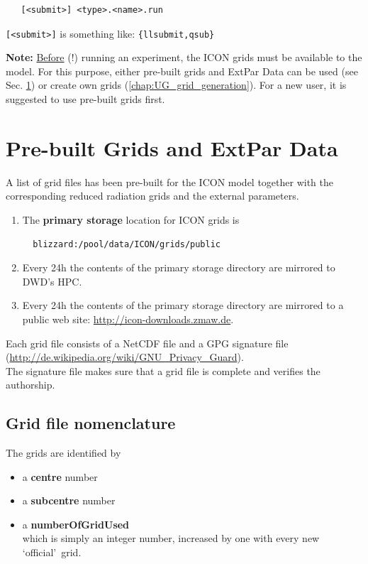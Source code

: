 \begin{small}
  \begin{verbatim}
   [<submit>] <type>.<name>.run
  \end{verbatim}
\end{small} 

\verb+[<submit>]+ is something like: \verb+{llsubmit,qsub}+

\textbf{Note:} \underline{Before} (!) running an experiment, the ICON grids must be available to the model. For this purpose, either pre-built grids and ExtPar Data can be used (see Sec. \ref{chap:prebuilt_grid}) or create own grids (\ref{chap:UG_grid_generation}). For a new user, it is suggested to use pre-built grids first.

\section{Pre-built Grids and ExtPar Data}\label{chap:prebuilt_grid}
A list of grid files has been pre-built for the ICON model together with the corresponding reduced radiation grids and the external parameters.

\begin{enumerate}

\item The \textbf{primary storage} location for ICON grids is
\begin{small}
 \begin{verbatim}
  blizzard:/pool/data/ICON/grids/public 
 \end{verbatim}
\end{small}
\item Every 24h the contents of the primary storage directory are mirrored to DWD's HPC.
\item Every 24h the contents of the primary storage directory are mirrored to a public web site:
\href{http://icon-downloads.zmaw.de}{http://icon-downloads.zmaw.de}.
\end{enumerate}

Each grid file consists of a NetCDF file and a GPG signature file\\ 
(\href{http://de.wikipedia.org/wiki/GNU\_Privacy\_Guard}{http://de.wikipedia.org/wiki/GNU\_Privacy\_Guard}).\\ 
The signature file makes sure that a grid file is complete and verifies the authorship.

\subsection{Grid file nomenclature}
The grids are identified by
\begin{itemize}
\item a \textbf{centre} number
\item a \textbf{subcentre} number
\item a \textbf{numberOfGridUsed}\\
which is simply an integer number, increased by one with every new \lq official\rq\ grid.  
\end{itemize}

